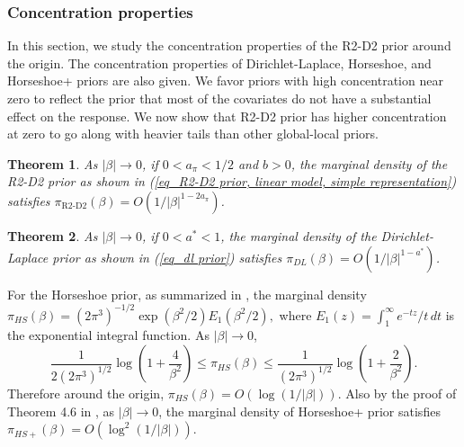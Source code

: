 \documentclass[12pt]{article}
\newtheorem{theorem}{Theorem}
\newtheorem{proposition}{Proposition}
\begin{document}
\subsubsection{Concentration properties}\label{Section_concentration properties}
In this section, we study the concentration properties of the R2-D2 prior around the origin. The concentration properties of Dirichlet-Laplace, Horseshoe, and Horseshoe+ priors are also given.  We favor priors with high concentration near zero to reflect the prior that most of the covariates do not have a substantial effect on the response.   We now show that   R2-D2 prior has higher  concentration at zero to go along with   heavier tails than other global-local priors.
\begin{theorem}\label{theorem_center properties R2-D2}
	As $|\beta|\rightarrow0$,
	if  $0< a_\pi < {1}/{2}$ and $b>0$,
	the marginal density of the  R2-D2  prior as shown in  (\ref{eq_R2-D2 prior, linear model, simple representation})
	satisfies
	$\pi_\text{R2-D2}(\beta)  = O( 1/ |\beta|^{ 1- 2a_\pi})$.
\end{theorem}


\begin{theorem}\label{theorem_center properties DL}
	As $|\beta|\rightarrow 0 $,   if  $0<a^\ast<1$,   the marginal density of the  Dirichlet-Laplace prior  as shown in (\ref{eq_dl prior}) satisfies    $
	\pi_{DL}(\beta)   = O(1/|\beta|^{1-a^\ast} ) $.
\end{theorem}





For the	Horseshoe prior,  as summarized in \cite{carvalho2010horseshoe},   the marginal density
$
\pi_{HS}(\beta) =    {(2\pi^3)^{-1/2}}  \exp(\beta^2/2 )E_1(\beta^2/2),
$    where $E_1(z) = \int_{1}^{\infty} e^{-tz}/t \, dt$ is the exponential integral function.
As $|\beta|\rightarrow 0$,
\[
\frac{1}{   2{(2\pi^3)^{1/2}} }  \log(1+\frac{4}{\beta^2}) \leq
\pi_{HS}(\beta) \leq \frac{1}{  {(2\pi^3)^{1/2}} }  \log(1+\frac{2}{\beta^2}).
\]
Therefore around the origin, $\pi_{HS}(\beta)  = O(\log ( {1}/{|\beta|}))$.
Also by the proof of Theorem 4$.$6 in \cite{bhadra2016horseshoe+}, as  $|\beta|\rightarrow 0$,  the marginal density of Horseshoe+ prior satisfies $\pi_{HS+}(\beta)  = O(\log^2(  {1}/{|\beta|}) )$.
\end{document}
